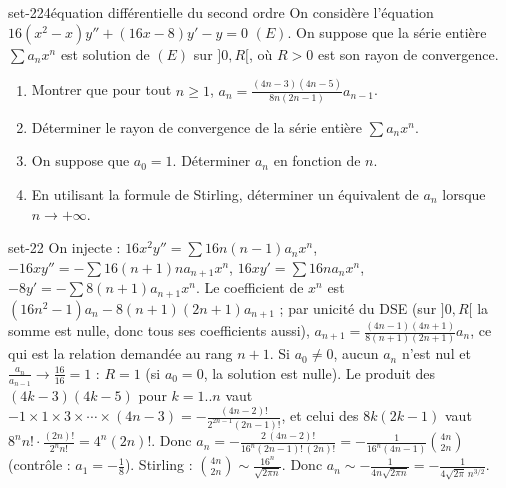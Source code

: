 \begin{exo}{set-22}{4}{équation différentielle du second ordre}
On considère l'équation $16(x^2-x)y''+(16x-8)y'-y=0$ $(E)$. On suppose que la série entière $\sum a_nx^n$ est solution de $(E)$ sur $]0,R[$, où
$R>0$ est son rayon de convergence.
\begin{enumerate}
\item Montrer que pour tout $n\geq1$, $a_n=\frac{(4n-3)(4n-5)}{8n(2n-1)}a_{n-1}$.
\item Déterminer le rayon de convergence de la série entière $\sum a_nx^n$.
\item On suppose que $a_0=1$. Déterminer $a_n$ en fonction de $n$.
\item En utilisant la formule de Stirling, déterminer un équivalent de $a_n$ lorsque $n\to+\infty$.
\end{enumerate}
\end{exo}

\begin{corrige}{set-22}
 On injecte : $16x^2y''=\sum16n(n-1)a_nx^n$, $-16xy''=-\sum16(n+1)na_{n+1}x^n$, $16xy'=\sum16na_nx^n$, $-8y'=-\sum8(n+1)a_{n+1}x^n$.
Le coefficient de $x^n$ est $(16n^2-1)a_n-8(n+1)(2n+1)a_{n+1}$ ; par unicité du DSE (sur $]0,R[$ la somme est nulle, donc tous ses
coefficients aussi), $a_{n+1}=\frac{(4n-1)(4n+1)}{8(n+1)(2n+1)}a_n$, ce qui est la relation demandée au rang $n+1$.
 Si $a_0\neq0$, aucun $a_n$ n'est nul et $\frac{a_n}{a_{n-1}}\to\frac{16}{16}=1$ : $R=1$ (si $a_0=0$, la solution est nulle).
 Le produit des $(4k-3)(4k-5)$ pour $k=1..n$ vaut $-1\times1\times3\times\cdots\times(4n-3)=-\frac{(4n-2)!}{2^{2n-1}(2n-1)!}$, et celui des
$8k(2k-1)$ vaut $8^nn!\cdot\frac{(2n)!}{2^nn!}=4^n(2n)!$. Donc $a_n=-\frac{2\,(4n-2)!}{16^n(2n-1)!\,(2n)!}=-\frac1{16^n(4n-1)}\binom{4n}{2n}$
(contrôle : $a_1=-\frac18$).
 Stirling : $\binom{4n}{2n}\sim\frac{16^n}{\sqrt{2\pi n}}$. Donc $a_n\sim-\frac1{4n\sqrt{2\pi n}}=-\frac1{4\sqrt{2\pi}\,n^{3/2}}$.
\end{corrige}
